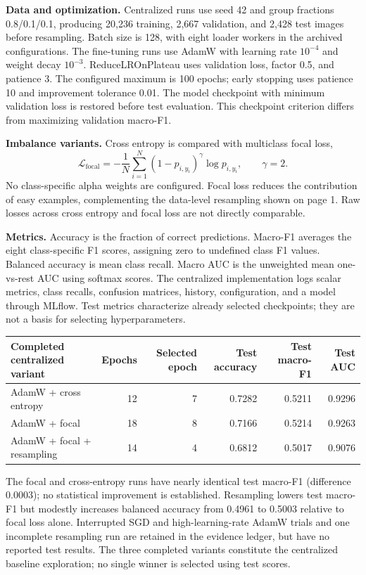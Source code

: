 \documentclass[10pt,a4paper]{article}
\begin{document}
\textbf{Data and optimization.} Centralized runs use seed 42 and group fractions 0.8/0.1/0.1, producing 20,236 training, 2,667 validation, and 2,428 test images before resampling. Batch size is 128, with eight loader workers in the archived configurations. The fine-tuning runs use AdamW with learning rate $10^{-4}$ and weight decay $10^{-3}$. ReduceLROnPlateau uses validation loss, factor 0.5, and patience 3. The configured maximum is 100 epochs; early stopping uses patience 10 and improvement tolerance 0.01. The model checkpoint with minimum validation loss is restored before test evaluation. This checkpoint criterion differs from maximizing validation macro-F1.

\textbf{Imbalance variants.} Cross entropy is compared with multiclass focal loss,
\[
\mathcal{L}_{\mathrm{focal}}=-\frac{1}{N}\sum_{i=1}^{N}(1-p_{i,y_i})^\gamma\log p_{i,y_i},\qquad \gamma=2.
\]
No class-specific alpha weights are configured. Focal loss reduces the contribution of easy examples, complementing the data-level resampling shown on page 1. Raw losses across cross entropy and focal loss are not directly comparable.

\textbf{Metrics.} Accuracy is the fraction of correct predictions. Macro-F1 averages the eight class-specific F1 scores, assigning zero to undefined class F1 values. Balanced accuracy is mean class recall. Macro AUC is the unweighted mean one-vs-rest AUC using softmax scores. The centralized implementation logs scalar metrics, class recalls, confusion matrices, history, configuration, and a model through MLflow. Test metrics characterize already selected checkpoints; they are not a basis for selecting hyperparameters.

\begin{center}
\small
\begin{tabular}{lrrrrr}
\toprule
Completed centralized variant & Epochs & Selected epoch & Test accuracy & Test macro-F1 & Test AUC\\
\midrule
AdamW + cross entropy & 12 & 7 & 0.7282 & 0.5211 & 0.9296\\
AdamW + focal & 18 & 8 & 0.7166 & 0.5214 & 0.9263\\
AdamW + focal + resampling & 14 & 4 & 0.6812 & 0.5017 & 0.9076\\
\bottomrule
\end{tabular}
\end{center}
The focal and cross-entropy runs have nearly identical test macro-F1 (difference 0.0003); no statistical improvement is established. Resampling lowers test macro-F1 but modestly increases balanced accuracy from 0.4961 to 0.5003 relative to focal loss alone. Interrupted SGD and high-learning-rate AdamW trials and one incomplete resampling run are retained in the evidence ledger, but have no reported test results. The three completed variants constitute the centralized baseline exploration; no single winner is selected using test scores.
\end{document}
